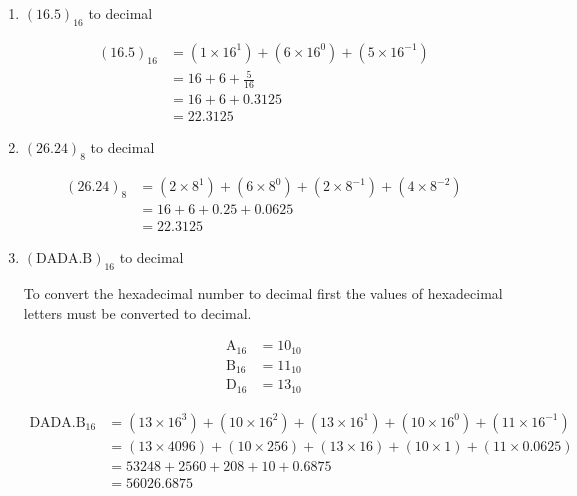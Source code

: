 \documentclass{article}
\begin{document}
\begin{enumerate}[label=\textbf{\arabic*.}]
\begin{enumerate}[label=\textbf{\alph*.}]
        \item \((16.5)_{16}\) to decimal \newline
        
        \begin{align*}
            (16.5)_{16} &= (1 \times 16^1) + (6 \times 16^0) + \left(5 \times 16^{-1}\right) \\
            &= 16 + 6 + \frac{5}{16} \\
            &= 16 + 6 + 0.3125 \\
            &= 22.3125
        \end{align*}
        

        \item \((26.24)_8\) to decimal \newline
        
        \begin{align*}
            \left(26.24\right)_{8} &= \left(2 \times 8^1\right) + \left(6 \times 8^0\right) + \left(2 \times 8^{-1}\right)+ \left(4 \times 8^{-2}\right) \\
            &= 16 + 6 + 0.25 + 0.0625 \\
            &= 22.3125
        \end{align*}
        
        \item \((\text{DADA.B})_{16}\) to decimal \newline
        
        To convert the hexadecimal number to decimal first the values of hexadecimal letters must be converted to decimal. \newline

        \begin{align*}
            \text{A}_{16} &= 10_{10} \\
            \text{B}_{16} &= 11_{10} \\
            \text{D}_{16} &= 13_{10}
        \end{align*}
        
        \begin{align*}
            \text{DADA.B}_{16} &= (13 \times 16^3) + (10 \times 16^2) + (13 \times 16^1) + (10 \times 16^0) + (11 \times 16^{-1}) \\
            &= (13 \times 4096) + (10 \times 256) + (13 \times 16) + (10 \times 1) + (11 \times 0.0625) \\
            &= 53248 + 2560 + 208 + 10 + 0.6875 \\
            &=56026.6875
        \end{align*}


\end{enumerate}
\end{enumerate}
\end{document}
